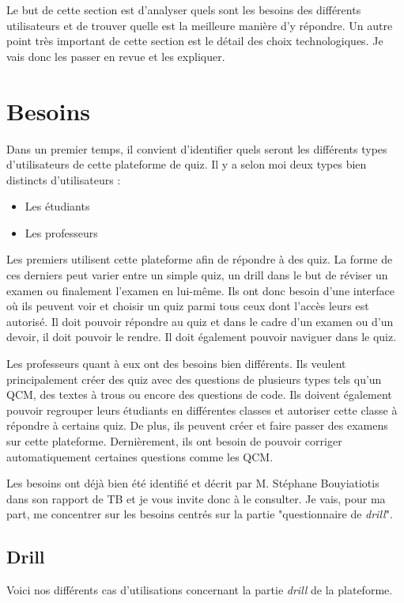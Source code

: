 Le but de cette section est d'analyser quels sont les besoins des différents utilisateurs et de trouver quelle est la meilleure manière d'y répondre. Un autre point très important de cette section est le détail des choix technologiques. Je vais donc les passer en revue et les expliquer.
\section{Besoins}

Dans un premier temps, il convient d'identifier quels seront les différents types d'utilisateurs de cette plateforme de quiz. Il y a selon moi deux types bien distincts d'utilisateurs :
\begin{itemize}
    \item Les étudiants
    \item Les professeurs
\end{itemize}

Les premiers utilisent cette plateforme afin de répondre à des quiz. La forme de ces derniers peut varier entre un simple quiz, un drill dans le but de réviser un examen ou finalement l'examen en lui-même. Ils ont donc besoin d'une interface où ils peuvent voir et choisir un quiz parmi tous ceux dont l'accès leurs est autorisé. Il doit pouvoir répondre au quiz et dans le cadre d'un examen ou d'un devoir, il doit pouvoir le rendre. Il doit également pouvoir naviguer dans le quiz.

Les professeurs quant à eux ont des besoins bien différents. Ils veulent principalement créer des quiz avec des questions de plusieurs types tels qu'un QCM, des textes à trous ou encore des questions de code. Ils doivent également pouvoir regrouper leurs étudiants en différentes classes et autoriser cette classe à répondre à certains quiz. De plus, ils peuvent créer et faire passer des examens sur cette plateforme. Dernièrement, ils ont besoin de pouvoir corriger automatiquement certaines questions comme les QCM.

Les besoins ont déjà bien été identifié et décrit par M. Stéphane Bouyiatiotis dans son rapport de TB et je vous invite donc à le consulter. Je vais, pour ma part, me concentrer sur les besoins centrés sur la partie "questionnaire de \emph{drill}".

\subsection{Drill}

Voici nos différents cas d'utilisations concernant la partie \emph{drill} de la plateforme.

